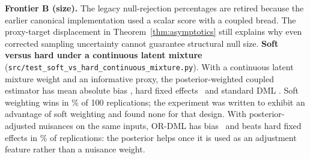\begin{table}[h]\centering\scriptsize
\caption{Legacy difficulty benchmark, all methods (\texttt{reports/or\_dml\_benchmark\_summary.csv}). Legacy uncertainty columns are omitted because they predate the corrected variance implementation.}\label{tab:frontier}

\end{table}
\textbf{Frontier B (size).} The legacy null-rejection percentages are retired because the earlier canonical implementation used a scalar score with a coupled bread. The proxy-target displacement in Theorem~\ref{thm:asymptotics} still explains why even corrected sampling uncertainty cannot guarantee structural null size.
\textbf{Soft versus hard under a continuous latent mixture} (\texttt{src/test\_soft\_vs\_hard\_continuous\_mixture.py}). With a continuous latent mixture weight and an informative proxy, the posterior-weighted coupled estimator has mean absolute bias \SVHSoft, hard fixed effects \SVHHard\ and standard DML \SVHStd. Soft weighting wins in \SVHWin\% of 100 replications; the experiment was written to exhibit an advantage of soft weighting and found none for that design. With posterior-adjusted nuisances on the same inputs, OR-DML has bias \SVHPA\ and beats hard fixed effects in \SVHPAWin\% of replications: the posterior helps once it is used as an adjustment feature rather than a nuisance weight.

